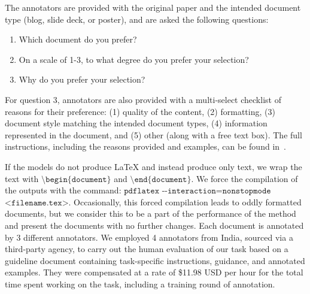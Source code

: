 The annotators are provided with the original paper and the intended document type (blog, slide deck, or poster), and are asked the following questions:
\begin{enumerate}[label={(\arabic*)}]
    \item Which document do you prefer?
    \item  On a scale of 1-3, to what degree do you prefer your selection?
    \item Why do you prefer your selection? 
\end{enumerate}
For question 3, annotators are also provided with a multi-select checklist of reasons for their preference: (1) quality of the content, (2) formatting, (3) document style matching the intended document types, (4) information represented in the document, and (5) other (along with a free text box). The full instructions, including the reasons provided and examples, can be found in~.

If the models do not produce LaTeX and instead produce only text, we wrap the text with $\texttt{\textbackslash begin\{document\}}$ and $\texttt{\textbackslash end\{document\}}$. We force  the compilation of the outputs with the command: $\texttt{pdflatex -{}-interaction=nonstopmode}$ $\texttt{<filename.tex>}$. Occasionally, this forced compilation leads to oddly formatted documents, but we consider this to be a part of the performance of the method and present the documents with no further changes. Each document is annotated by 3 different annotators. We employed 4 annotators from India, sourced via a third-party agency, to carry out the human evaluation of our task based on a guideline document containing task-specific instructions, guidance, and annotated examples. They were compensated at a rate of \$11.98 USD per hour for the total time spent working on the task, including a training round of annotation.
% 

\vspace{-1mm}
